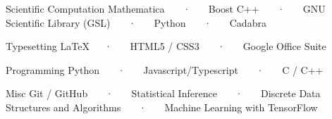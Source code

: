 

\begin{cvskills}

  \cvskill
    {Scientific Computation} %
    {Mathematica ~~~·~~~ Boost C++ ~~~·~~~ GNU Scientific Library (GSL) ~~~·~~~ Python ~~~·~~~ Cadabra} %

  \cvskill
    {Typesetting} %
    {\LaTeX ~~~·~~~ HTML5 / CSS3 ~~~·~~~ Google Office Suite} %

  \cvskill
    {Programming} %
    {Python ~~~·~~~ Javascript/Typescript ~~~·~~~ C / C++} %

  \cvskill
    {Misc} %
    {Git / GitHub ~~~·~~~ Statistical Inference ~~~·~~~ Discrete Data Structures and Algorithms ~~~·~~~ Machine Learning with TensorFlow} %


\end{cvskills}
